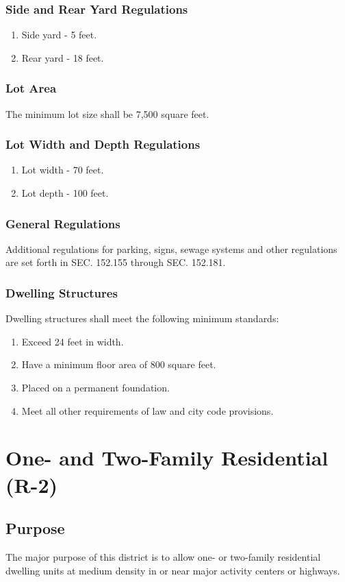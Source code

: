 \subsubsection{Side and Rear Yard Regulations}
\begin{enumerate}[{\indent}a)]
    \item Side yard - 5 feet.  
    \item Rear yard - 18 feet.
\end{enumerate}
\subsubsection{Lot Area}
The minimum lot size shall be 7,500 square feet.
\subsubsection{Lot Width and Depth Regulations}
\begin{enumerate}[{\indent}a)]
    \item Lot width - 70 feet.  
    \item Lot depth - 100 feet.
\end{enumerate}
\subsubsection{General Regulations}
Additional regulations for parking, signs, sewage systems and other regulations are set forth in SEC. 152.155 through SEC. 152.181.
\subsubsection{Dwelling Structures}
Dwelling structures shall meet the following minimum standards:
\begin{enumerate}[{\indent}a)]
    \item Exceed 24 feet in width.
    \item Have a minimum floor area of 800 square feet.
    \item Placed on a permanent foundation.
    \item Meet all other requirements of law and city code provisions.
\end{enumerate}

\section{One- and Two-Family Residential (R-2)}
\subsection{Purpose}
The major purpose of this district is to allow one- or two-family residential dwelling units at medium density in or near major activity centers or highways.
